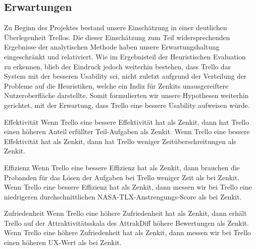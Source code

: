 \subsection{Erwartungen}

Zu Beginn des Projektes bestand unsere Einschätzung in einer deutlichen Überlegenheit Trellos. Die dieser Einschätzung zum Teil widersprechenden Ergebnisse der analytischen Methode haben unsere Erwartungshaltung eingeschränkt und relativiert. Wie im Ergebnisteil der Heuristischen Evaluation zu erkennen, blieb der Eindruck jedoch weiterhin bestehen, dass Trello das System mit der besseren Usability sei, nicht zuletzt aufgrund der Verteilung der Probleme auf die Heuristiken, welche ein Indiz für Zenkits unausgereiftere Nutzeroberfläche darstellte. Somit formulierten wir unsere Hypothesen weiterhin gerichtet, mit der Erwartung, dass Trello eine bessere Usability aufweisen würde.

\begin{outline}[enumerate]
\1 Effektivität
    \2 Wenn Trello eine bessere Effektivität hat als Zenkit, dann hat Trello einen höheren Anteil erfüllter Teil-Aufgaben als Zenkit.
    \2 Wenn Trello eine bessere Effektivität hat als Zenkit,
dann hat Trello weniger Zeitüberschreitungen als Zenkit.

\1 Effizienz
    \2 Wenn Trello eine bessere Effizienz hat als Zenkit, dann brauchen die Probanden für das Lösen der Aufgaben bei Trello weniger Zeit als bei Zenkit.
    \2 Wenn Trello eine bessere Effizienz hat als Zenkit,
dann messen wir bei Trello eine niedrigeren durchschnittlichen NASA-TLX-Anstrengungs-Score als bei Zenkit.


\1 Zufriedenheit
    \2 Wenn Trello eine höhere Zufriedenheit hat als Zenkit,
dann erhält Trello  auf der Attraktivitätsskala des AttrakDiff höhere Bewertungen als Zenkit.
    \2 Wenn Trello eine höhere Zufriedenheit hat als Zenkit,
dann messen wir bei Trello einen höheren UX-Wert als bei Zenkit.

\end{outline} 